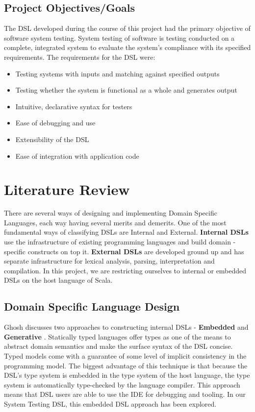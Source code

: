 \documentclass[12 pt]{article}
\begin{document}
\subsection{Project Objectives/Goals}
The DSL developed during the course of this project had the primary objective of software system testing. System testing of software is testing conducted on a complete, integrated system to evaluate the system's compliance with its specified requirements. The requirements for the DSL were:
\begin{itemize}
\item Testing systems with inputs and matching against specified outputs
\item Testing whether the system is functional as a whole and generates output
\item Intuitive, declarative syntax for testers
\item Ease of debugging and use
\item Extensibility of the DSL
\item Ease of integration with application code
\end{itemize}

\newpage
\section{Literature Review}
There are several ways of designing and implementing Domain Specific Languages, each way having several merits and demerits. One of the most fundamental ways of classifying DSLs are Internal and External. \textbf{Internal DSLs} use the infrastructure of existing programming languages and build domain - specific constructs on top it. \textbf{External DSLs} are developed ground up and has separate infrastructure for lexical analysis, parsing, interpretation and compilation. In this project, we are restricting ourselves to internal or embedded DSLs on the host language of Scala.
\bigskip

\subsection{Domain Specific Language Design}
Ghosh discusses two approaches to constructing internal DSLs - \textbf{Embedded} and \textbf{Generative} \cite{dslsInAction}. Statically typed languages offer types as one of the means to abstract domain semantics and make the surface syntax of the DSL concise. Typed models come with a
guarantee of some level of implicit consistency in the programming model. The biggest advantage of this technique is that because the DSL’s type system is embedded in the type system of the host language, the type system is automatically type-checked by the language compiler. This approach means that DSL users are able to use the IDE for debugging and tooling. In our System Testing DSL, this embedded DSL approach has been explored.
\bigskip
\end{document}
